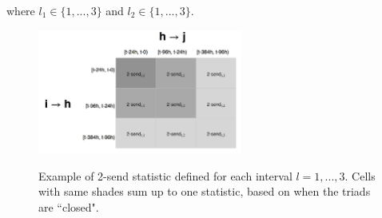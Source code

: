 \documentclass[a4paper]{article}
\begin{document}
where $l_1 \in \{1,...,3\}$ and $l_2 \in \{1,...,3\}$.
\begin{figure}[ht]
	\centering
	\includegraphics[width=0.6\textwidth]{plots/triadtable.jpg} 
	\label{fig:triadtable}
	\caption{Example of 2-send statistic defined for each interval $l=1,...,3$. Cells with same shades sum up to one statistic, based on when the triads are ``closed".}
\end{figure}
\end{document}
